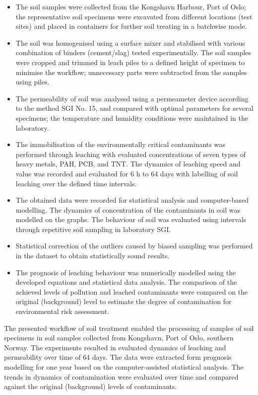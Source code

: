\documentclass[algorithms,article,accept,pdftex,moreauthors]{Definitions/mdpi}
\begin{document}
\begin{itemize}
	\item The soil samples were collected from the Kongshavn Harbour, Port of Oslo; {the} representative soil specimens were excavated from different locations (test sites) and placed in containers {for} further soil treating in {a }batchwise mode.
	\item The soil was homogenised using a surface mixer and stabilised with various combination of binders (cement/slag) {tested experimentally}. The soil samples were cropped and trimmed in leach piles to a defined height of specimen to minimise the workflow; unnecessary parts were subtracted from the samples using piles. 
	\item {The }permeability of soil was {analysed} using a permeameter device according to {the }method SGI No. 15, and compared with optimal parameters for several specimens; the temperature and humidity conditions were maintained in the laboratory.
	\item The {immobilisation} of {}the {environmentally critical }contaminants was performed through leaching{ with evaluated concentrations of } seven types of heavy metals, PAH, PCB, and TNT. The dynamics of leaching speed and value was {recorded and evaluated for 6 h to 64 days} with labelling of soil leaching over {the }defined time intervals. 
	\item The obtained data were recorded for statistical analysis and computer-based modelling. The {dynamics of concentration of the }contaminants in soil {was modelled} on the graphs{. }The behaviour of soil was evaluated using intervals through repetitive soil sampling in laboratory SGI. 
	\item {Statistical correction of the }outliers {caused by biased sampling was performed in the dataset to obtain statistically sound results}. 
	\item The prognosis of {leaching} behaviour was numerically modelled using the developed equations and statistical data analysis. The comparison of the achieved levels of pollution and leached contaminants were compared on the original ({background}) level to {estimate the degree of contamination for environmental risk assessment}.  
\end{itemize}

{The} presented workflow of soil treatment enabled the processing of samples of soil specimens {in soil samples collected from Kongshavn, Port of Oslo, southern Norway. The experiments resulted in evaluated }dynamics of leaching and permeability over time of {64 days. The data were extracted form prognosis modelling for one year based on the }computer-assisted statistical analysis{. The trends in dynamics} of contamination {were evaluated }over time and {compared against }the original (background) levels of contaminants. 
\end{document}

